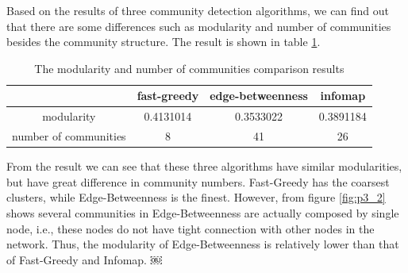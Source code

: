 \documentclass{article}
\begin{document}
\noindent Based on the results of three community detection algorithms, we can find out that there are some differences such as modularity and number of communities besides the community structure. The result is shown in table \ref{tb:p3}.
\begin {table}[htbp]
\caption{The modularity and number of communities comparison results}
\begin{adjustbox}{center}
\label{tb:p3}
\begin{tabular}{|c|c|c|c|}
\hline
&fast-greedy &edge-betweenness &infomap\\
\hline
modularity&0.4131014&0.3533022&0.3891184\\
\hline
number of communities&8&41 & 26\\
\hline
\end{tabular}
\end{adjustbox}
\end{table}
From the result we can see that these three algorithms have similar modularities, but have great difference in community numbers. Fast-Greedy has the coarsest clusters, while Edge-Betweenness is the finest. However, from figure \ref{fig:p3_2} shows several communities in Edge-Betweenness are actually composed by single node, i.e., these nodes do not have tight connection with other nodes in the network. Thus, the modularity of Edge-Betweenness is relatively lower than that of Fast-Greedy and Infomap.
￼
\end{document}
